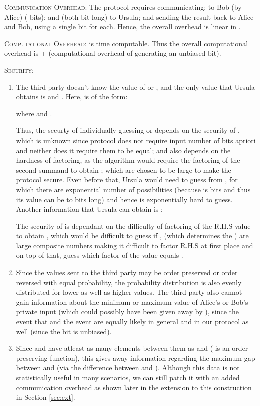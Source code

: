 \documentclass[11pt, letterpaper, romanappendices, onecolumn]{article}
\theoremstyle{plain}\newtheorem{thm}{Theorem}[section]
\theoremstyle{definition}
\theoremstyle{remark}
\begin{document}
\par \textsc{Communication Overhead:} The protocol requires communicating:  to Bob (by Alice) ( bits);  and  (both  bit long) to Ursula; and sending the result back to Alice and Bob, using a single bit for each. Hence, the overall overhead is linear in .

\par \textsc{Computational Overhead:}  is  time computable. Thus the overall computational overhead is  + (computational overhead of generating an unbiased bit).

\par \textsc{Security:}\label{issue}
\begin{enumerate}
	\item The third party doesn't know the value of  or , and the only value that Ursula obtains is  and . Here,  is of the form:


where  and . 
\par Thus, the securty of individually guessing  or  depends on the security of , which is unknown since protocol does not require input number of bits apriori and neither does it require them to be equal; and also depends on the hardness of factoring, as the algorithm would require the factoring of the second summand to obtain ; which are chosen to be large to make the protocol secure. Even before that, Ursula would need to guess  from , for which there are exponential number of possibilities (because  is  bits and thus its value can be  to  bits long) and hence is exponentially hard to guess. Another information that Ursula can obtain is :

The security of  is dependant on the difficulty of factoring of the R.H.S value to obtain , which would be difficult to guess if ,  (which determines the ) are large composite numbers making it difficult to factor R.H.S at first place and on top of that, guess which factor of the value equals .
	\item Since the values sent to the third party may be order preserved or order reversed with equal probability, the probability distribution is also evenly distributed for lower as well as higher values. The third party also cannot gain information about the minimum or maximum value of Alice's or Bob's private input (which could possibly have been given away by ), since the event that  and the event  are equally likely in general and in our protocol as well (since the bit  is unbiased).
	\item Since  and  have atleast as many elements between them as  and  ( is an order preserving function), this gives away information regarding the maximum gap between  and  (via the difference between  and ). Although this data is not statistically useful in many scenarios, we can still patch it with an added communication overhead as shown later in the extension to this construction in Section \ref{sec:ext}.
\end{enumerate}
\end{document}
